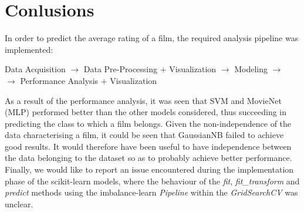 \documentclass[../main]{subfiles}
\begin{document}
\chapter{Conlusions}
In order to predict the average rating of a film, the required analysis pipeline was implemented:
\begin{center}
    Data Acquisition $\rightarrow$ Data Pre-Processing $+$ Visualization $\rightarrow$ Modeling $\rightarrow$ \\ $\rightarrow$ Performance Analysis $+$ Visualization
\end{center}
As a result of the performance analysis, it was seen that SVM and MovieNet (MLP) performed better than the other models considered, thus succeeding in predicting the class to which a film belongs.
Given the non-independence of the data characterising a film, it could be seen that GaussianNB failed to achieve good results.
It would therefore have been useful to have independence between the data belonging to the dataset so as to probably achieve better performance.
Finally, we would like to report an issue encountered during the implementation phase of the scikit-learn models, where the behaviour of the \textit{fit}, \textit{fit\_transform} and \textit{predict} methods using the imbalance-learn \textit{Pipeline} within the \textit{GridSearchCV} was unclear.
\end{document}
